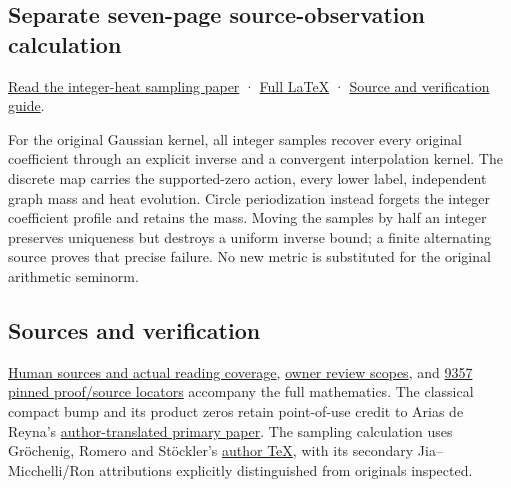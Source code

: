 \documentclass[
]{article}
\begin{document}
\subsection{Separate seven-page source-observation
calculation}\label{separate-seven-page-source-observation-calculation}

\href{https://zenodo.org/records/22911829/files/174-splitzero-integer-heat-observation.pdf?download=1}{Read
the integer-heat sampling paper} ·
\href{https://github.com/KokunoYumeto/zeta-function-research-reader/blob/f4fbe917fa82e56ab74065e3eba04197b7f11b97/workbenches/splitzero-tandem/continuations/20260923-integer-heat-observation/NOTE.tex}{Full
LaTeX} ·
\href{https://github.com/KokunoYumeto/zeta-function-research-reader/blob/f4fbe917fa82e56ab74065e3eba04197b7f11b97/workbenches/splitzero-tandem/continuations/20260923-integer-heat-observation/README.md}{Source
and verification guide}.

For the original Gaussian kernel, all integer samples recover every
original coefficient through an explicit inverse and a convergent
interpolation kernel. The discrete map carries the supported-zero
action, every lower label, independent graph mass and heat evolution.
Circle periodization instead forgets the integer coefficient profile and
retains the mass. Moving the samples by half an integer preserves
uniqueness but destroys a uniform inverse bound; a finite alternating
source proves that precise failure. No new metric is substituted for the
original arithmetic seminorm.

\subsection{Sources and verification}\label{sources-and-verification}

\href{https://github.com/KokunoYumeto/zeta-function-research-reader/blob/a8e35be8f238913ae5bcbd8ad55a07d539b350f3/workbenches/splitzero-tandem/branches/tau-zero-prime-positivity/SOURCES.md}{Human
sources and actual reading coverage},
\href{https://github.com/KokunoYumeto/zeta-function-research-reader/blob/a8e35be8f238913ae5bcbd8ad55a07d539b350f3/workbenches/splitzero-tandem/branches/tau-zero-prime-positivity/ORIGINAL_ZETA_VALIDATION.json}{owner
review scopes}, and \href{PINNED_PROOF_LINKS.json}{9357 pinned
proof/source locators} accompany the full mathematics. The classical
compact bump and its product zeros retain point-of-use credit to Arias
de Reyna's \href{https://arxiv.org/abs/1702.05442v1}{author-translated
primary paper}. The sampling calculation uses Gröchenig, Romero and
Stöckler's \href{https://arxiv.org/abs/1612.00651v2}{author TeX}, with
its secondary Jia--Micchelli/Ron attributions explicitly distinguished
from originals inspected.
\end{document}
